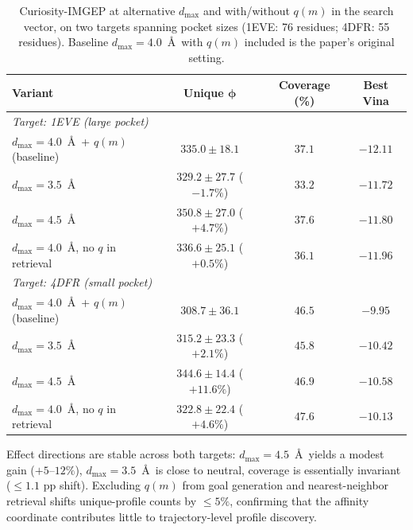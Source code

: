 \documentclass[journal=jcisd8,manuscript=suppinfo]{achemso}
\begin{document}
\begin{table}[ht]
\centering
\caption{Curiosity-IMGEP at alternative $d_{\max}$ and with/without $q(m)$ in the search vector, on two targets spanning pocket sizes (1EVE: 76 residues; 4DFR: 55 residues). Baseline $d_{\max} = 4.0$~\AA\ with $q(m)$ included is the paper's original setting.}
\label{tab:cutoff}
\begin{tabular}{lccc}
\toprule
\textbf{Variant} & \textbf{Unique $\boldsymbol{\phi}$} & \textbf{Coverage (\%)} & \textbf{Best Vina} \\
\midrule
\multicolumn{4}{l}{\emph{Target: 1EVE (large pocket)}} \\
$d_{\max} = 4.0$~\AA\ + $q(m)$ (baseline) & $335.0 \pm 18.1$ & $37.1$ & $-12.11$ \\
$d_{\max} = 3.5$~\AA & $329.2 \pm 27.7$ ($-1.7\%$) & $33.2$ & $-11.72$ \\
$d_{\max} = 4.5$~\AA & $350.8 \pm 27.0$ ($+4.7\%$) & $37.6$ & $-11.80$ \\
$d_{\max} = 4.0$~\AA, no $q$ in retrieval & $336.6 \pm 25.1$ ($+0.5\%$) & $36.1$ & $-11.96$ \\
\midrule
\multicolumn{4}{l}{\emph{Target: 4DFR (small pocket)}} \\
$d_{\max} = 4.0$~\AA\ + $q(m)$ (baseline) & $308.7 \pm 36.1$ & $46.5$ & $-9.95$ \\
$d_{\max} = 3.5$~\AA & $315.2 \pm 23.3$ ($+2.1\%$) & $45.8$ & $-10.42$ \\
$d_{\max} = 4.5$~\AA & $344.6 \pm 14.4$ ($+11.6\%$) & $46.9$ & $-10.58$ \\
$d_{\max} = 4.0$~\AA, no $q$ in retrieval & $322.8 \pm 22.4$ ($+4.6\%$) & $47.6$ & $-10.13$ \\
\bottomrule
\end{tabular}
\end{table}

Effect directions are stable across both targets: $d_{\max} = 4.5$~\AA\ yields a modest gain ($+5$--$12\%$), $d_{\max} = 3.5$~\AA\ is close to neutral, coverage is essentially invariant ($\leq 1.1$ pp shift). Excluding $q(m)$ from goal generation and nearest-neighbor retrieval shifts unique-profile counts by $\leq 5\%$, confirming that the affinity coordinate contributes little to trajectory-level profile discovery.
\end{document}
